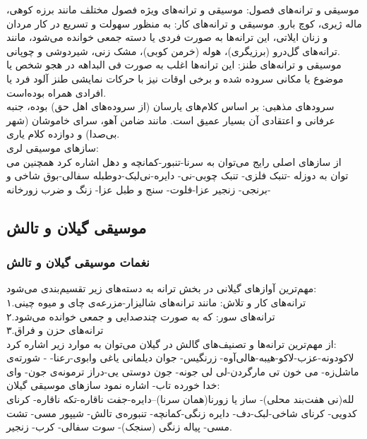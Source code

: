 موسیقی و ترانه‌های فصول: موسیقی و ترانه‌های ویژه فصول مختلف مانند برزه کوهی، ماله ژیری، کوچ بارو.
موسیقی و ترانه‌های کار: به منظور سهولت و تسریع در کار مردان و زنان ایلاتی، این ترانه‌ها به صورت فردی یا دسته جمعی خوانده می‌شود، مانند ترانه‌های گل‌درو (برزیگری)، هوله (خرمن کوبی)، مشک زنی، شیردوشی و چوپانی.\\

موسیقی و ترانه‌های طنز: این ترانه‌ها اغلب به صورت فی البداهه در هجو شخص یا موضوع یا مکانی سروده شده و برخی اوقات نیز با حرکات نمایشی طنز آلود فرد یا افرادی همراه بوده‌است.
\\
سرودهای مذهبی: بر اساس کلام‌های یارسان (از سروده‌های اهل حق) بوده، جنبه عرفانی و اعتقادی آن بسیار عمیق است. مانند ضامن آهو، سرای خاموشان (شهر بی‌صدا) و دوازده کلام یاری.\\


سازهای موسیقی لری:\\

از سازهای اصلی رایج می‌توان به سرنا-تنبور-کمانچه و دهل اشاره کرد همچنین می توان به دوزله -تنبک فلزی- تنبک چوبی-نی- دایره-نی‌لبک-دوطبله سفالی-بوق شاخی و برنجی- زنجیر عزا-فلوت- سنج و طبل عزا- زنگ و ضرب زورخانه-

\subsection{موسیقی گیلان و تالش}
\subsubsection{نغمات موسیقی گیلان و تالش}
مهم‌ترین آوازهای گیلانی در بخش ترانه به دسته‌های زیر تقسیم‌بندی می‌شود:\\
۱.ترانه‌های کار و تلاش: مانند ترانه‌های شالیزار-مزرعه‌ی چای و میوه چینی\\
۲.ترانه‌های سور: که به صورت چندصدایی و جمعی خوانده می‌شود\\
۳.ترانه‌های حزن و فراق\\
از مهم‌ترین ترانه‌ها و تصنیف‌های گالش در گیلان می‌توان به موارد زیر اشاره کرد:\\
لاکودونه-عزب-لاکو-هیبه-هالی‌آوه- زرنگیس- جوان دیلمانی یاغی وابوی-رعنا- - شورته‌ی ماشل‌زه- می خون تی مارگردن-لی لی جونه- جون دوستی یی-دراز ترمونه‌ی جون- وای خدا خورده تاب- اشاره نمود
 سازهای موسیقی گیلان:\\
 لله(نی هفت‌بند محلی)- ساز یا زورنا(همان سرنا)--دایره-جفت ناقاره-تکه ناقاره- کرنای کدویی- کرنای شاخی-لبک-دف- دایره زنگی-کمانچه- تنبوره‌ی تالش- شیپور مسی- تشت مسی- پیاله زنگی (سنجک)- سوت سفالی- کرب- زنجیر.\\
